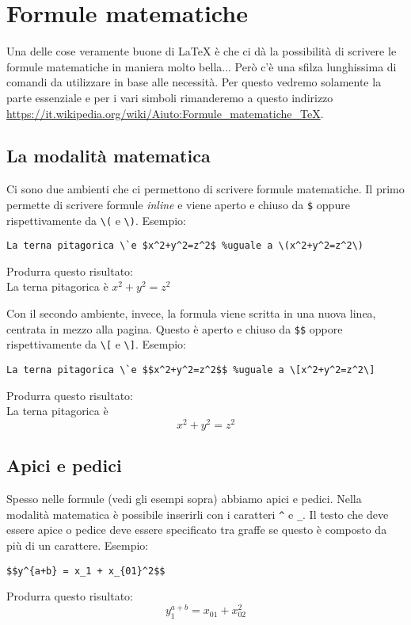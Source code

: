 \chapter{Formule matematiche}
Una delle cose veramente buone di \LaTeX{} è che ci dà la possibilità di scrivere le formule matematiche in maniera molto bella... Però c'è una sfilza lunghissima di comandi da utilizzare in base alle necessità. Per questo vedremo solamente la parte essenziale e per i vari simboli rimanderemo a questo indirizzo \url{https://it.wikipedia.org/wiki/Aiuto:Formule_matematiche_TeX}.

\section{La modalità matematica}
Ci sono due ambienti che ci permettono di scrivere formule matematiche. Il primo permette di scrivere formule \textit{inline} e viene aperto e chiuso da \verb!$! oppure rispettivamente da \verb!\(! e \verb!\)!. Esempio:
\begin{lstlisting}
La terna pitagorica \`e $x^2+y^2=z^2$ %uguale a \(x^2+y^2=z^2\)
\end{lstlisting}
Produrra questo risultato:\\
La terna pitagorica \`e $x^2+y^2=z^2$
\\ \par
Con il secondo ambiente, invece, la formula viene scritta in una nuova linea, centrata in mezzo alla pagina. Questo è aperto e chiuso da \verb!$$! oppore rispettivamente da \verb!\[! e \verb!\]!. Esempio:
\begin{lstlisting}
La terna pitagorica \`e $$x^2+y^2=z^2$$ %uguale a \[x^2+y^2=z^2\]
\end{lstlisting}
Produrra questo risultato:\\
La terna pitagorica \`e $$x^2+y^2=z^2$$

\section{Apici e pedici}
Spesso nelle formule (vedi gli esempi sopra) abbiamo apici e pedici. Nella modalità matematica è possibile inserirli con i caratteri \verb!^! e \verb!_!. Il testo che deve essere apice o pedice deve essere specificato tra graffe se questo è composto da più di un carattere. Esempio:
\begin{lstlisting}
$$y^{a+b} = x_1 + x_{01}^2$$
\end{lstlisting}
Produrra questo risultato:\\
$$y_1^{a+b} = x_{01} + x_{02}^2$$

